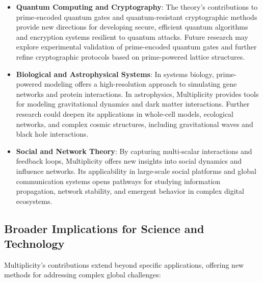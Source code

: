 \documentclass{article}
\theoremstyle{plain}
\begin{document}
\begin{itemize}
    \item \textbf{Quantum Computing and Cryptography}: The theory’s contributions to prime-encoded quantum gates and quantum-resistant cryptographic methods provide new directions for developing secure, efficient quantum algorithms and encryption systems resilient to quantum attacks. Future research may explore experimental validation of prime-encoded quantum gates and further refine cryptographic protocols based on prime-powered lattice structures.
    
    \item \textbf{Biological and Astrophysical Systems}: In systems biology, prime-powered modeling offers a high-resolution approach to simulating gene networks and protein interactions. In astrophysics, Multiplicity provides tools for modeling gravitational dynamics and dark matter interactions. Further research could deepen its applications in whole-cell models, ecological networks, and complex cosmic structures, including gravitational waves and black hole interactions.
    
    \item \textbf{Social and Network Theory}: By capturing multi-scalar interactions and feedback loops, Multiplicity offers new insights into social dynamics and influence networks. Its applicability in large-scale social platforms and global communication systems opens pathways for studying information propagation, network stability, and emergent behavior in complex digital ecosystems.
\end{itemize}

\subsection{Broader Implications for Science and Technology}

Multiplicity’s contributions extend beyond specific applications, offering new methods for addressing complex global challenges:
\end{document}
